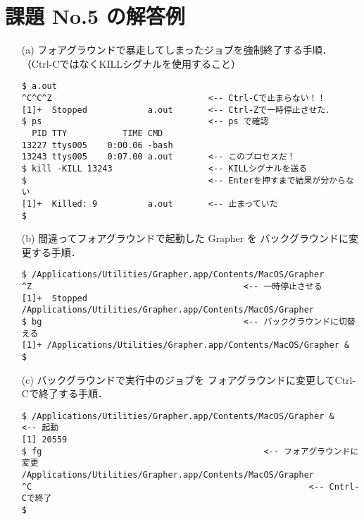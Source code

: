 \documentclass[a4j,twcolumn,11pt,nomag]{ltjarticle}      %
\begin{document}
\onecolumn

\section*{課題 No.5 の解答例}
\begin{enumerate}
\item[(a)] フォアグラウンドで暴走してしまったジョブを強制終了する手順．
（Ctrl-CではなくKILLシグナルを使用すること）

\begin{lstlisting}
$ a.out
^C^C^Z                               <-- Ctrl-Cで止まらない！！
[1]+  Stopped            a.out       <-- Ctrl-Zで一時停止させた．
$ ps                                 <-- ps で確認
  PID TTY           TIME CMD
13227 ttys005    0:00.06 -bash
13243 ttys005    0:07.00 a.out       <-- このプロセスだ！
$ kill -KILL 13243                   <-- KILLシグナルを送る
$                                    <-- Enterを押すまで結果が分からない
[1]+  Killed: 9          a.out       <-- 止まっていた
$
\end{lstlisting}

\item[(b)] 間違ってフォアグラウンドで起動した Grapher を
バックグラウンドに変更する手順．

\begin{lstlisting}
$ /Applications/Utilities/Grapher.app/Contents/MacOS/Grapher
^Z                                          <-- 一時停止させる
[1]+  Stopped  /Applications/Utilities/Grapher.app/Contents/MacOS/Grapher
$ bg                                        <-- バックグラウンドに切替える
[1]+ /Applications/Utilities/Grapher.app/Contents/MacOS/Grapher &
$
\end{lstlisting}

\item[(c)] バックグラウンドで実行中のジョブを
フォアグラウンドに変更してCtrl-Cで終了する手順．

\begin{lstlisting}
$ /Applications/Utilities/Grapher.app/Contents/MacOS/Grapher &    <-- 起動
[1] 20559
$ fg                                            <-- フォアグラウンドに変更
/Applications/Utilities/Grapher.app/Contents/MacOS/Grapher
^C                                                       <-- Cntrl-Cで終了
$
\end{lstlisting}
\end{enumerate}
\end{document}
